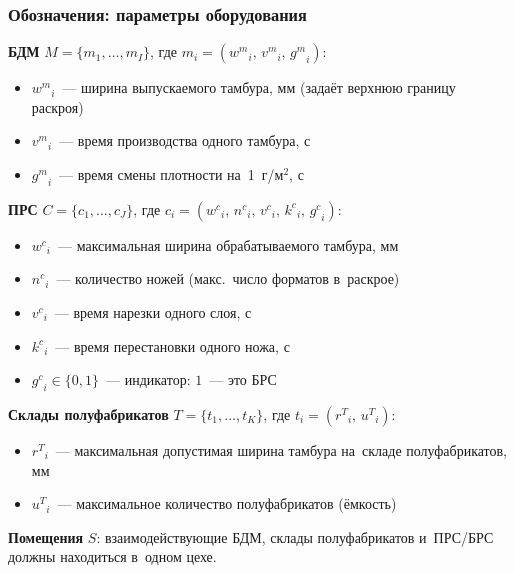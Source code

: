 \begin{frame}
    \frametitle{Обозначения: параметры оборудования}
    \small
    \textbf{БДМ} $M=\{m_1,\ldots,m_I\}$, где $m_i=({w^m}_i,\,{v^m}_i,\,{g^m}_i)$:
    \begin{itemize}
        \item ${w^m}_i$~--- ширина выпускаемого тамбура, мм (задаёт верхнюю границу раскроя)
        \item ${v^m}_i$~--- время производства одного тамбура, с
        \item ${g^m}_i$~--- время смены плотности на~1~г/м$^2$, с
    \end{itemize}

    \vspace{0.3cm}
    \textbf{ПРС} $C=\{c_1,\ldots,c_J\}$, где $c_i=({w^c}_i,\,{n^c}_i,\,{v^c}_i,\,{k^c}_i,\,{g^c}_i)$:
    \begin{itemize}
        \item ${w^c}_i$~--- максимальная ширина обрабатываемого тамбура, мм
        \item ${n^c}_i$~--- количество ножей (макс.\ число форматов в~раскрое)
        \item ${v^c}_i$~--- время нарезки одного слоя, с
        \item ${k^c}_i$~--- время перестановки одного ножа, с
        \item ${g^c}_i\in\{0,1\}$~--- индикатор: $1$~--- это БРС
    \end{itemize}
    \textbf{Склады полуфабрикатов} $T=\{t_1,\ldots,t_K\}$, где $t_i=({r^T}_i,\,{u^T}_i)$:
    \begin{itemize}
        \item ${r^T}_i$~--- максимальная допустимая ширина тамбура на~складе полуфабрикатов, мм
        \item ${u^T}_i$~--- максимальное количество полуфабрикатов (ёмкость)
    \end{itemize}
    \textbf{Помещения} $S$: взаимодействующие БДМ, склады полуфабрикатов и~ПРС/БРС должны находиться в~одном цехе.
\end{frame}

